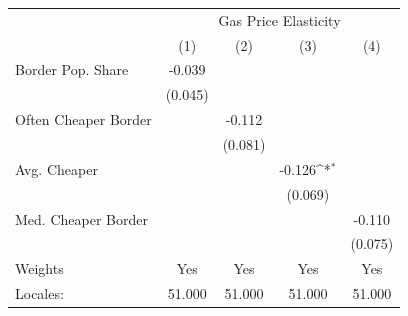 {
\def\sym#1{\ifmmode^{#1}\else\(^{#1}\)\fi}
\begin{tabular}{l*{4}{c}}
\hline\hline
            &\multicolumn{4}{c}{Gas Price Elasticity}                                               \\
            &\multicolumn{1}{c}{(1)}         &\multicolumn{1}{c}{(2)}         &\multicolumn{1}{c}{(3)}         &\multicolumn{1}{c}{(4)}         \\
\hline
Border Pop. Share&      -0.039         &                     &                     &                     \\
            &     (0.045)         &                     &                     &                     \\
[1em]
Often Cheaper Border&                     &      -0.112         &                     &                     \\
            &                     &     (0.081)         &                     &                     \\
[1em]
Avg. Cheaper&                     &                     &      -0.126\sym{*}  &                     \\
            &                     &                     &     (0.069)         &                     \\
[1em]
Med. Cheaper Border&                     &                     &                     &      -0.110         \\
            &                     &                     &                     &     (0.075)         \\
\hline
Weights     &         Yes         &         Yes         &         Yes         &         Yes         \\
Locales:    &      51.000         &      51.000         &      51.000         &      51.000         \\
\hline\hline
\end{tabular}
}
